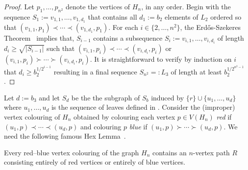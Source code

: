 \documentclass[kpfonts]{patmorin}
\renewcommand{\ge}{\geqslant}
\begin{document}
\begin{proof}
    Let $p_1,\ldots,p_{n^2}$ denote the vertices of $H_n$, in any order.
    Begin with the sequence $S_1:=v_{1,1},\ldots,v_{1,d_1}$ that contains all $d_1:=b_2$ elements of $L_2$ ordered so that $(v_{1,1},p_1)\prec\cdots\prec(v_{1,d_1},p_1)$.  For each $i\in\{2,\ldots,n^2\}$, the Erd\H{o}s-Szekeres Theorem~\citep{ES35} implies that, $S_{i-1}$ contains a subsequence $S_i:=v_{i,1},\ldots,v_{i,d_i}$ of length $d_i\ge \sqrt{|S_{i-1}|}$ such that $(v_{i,1},p_i)\prec\cdots\prec(v_{i,d_i},p_i)$ or $(v_{i,1},p_i)\succ\cdots\succ(v_{i,d_i},p_i)$.  It is straightforward to verify by induction on $i$ that $d_i \ge b_2^{1/2^{i-1}}$ resulting in a final sequence $S_{n^2}=:L_3$ of length at least $b_2^{1/2^{n^2-1}}$.
\end{proof}

Let $d:=b_3$ and let $S_d$ be the the subgraph of $S_b$ induced by $\{r\}\cup\{u_1,\ldots,u_{d}\}$ where $u_1,\ldots,u_d$ is the sequence of leaves defined in .  Consider the (improper) vertex colouring of $H_n$ obtained by colouring each vertex $p\in V(H_n)$ \emph{red} if $(u_1,p)\prec\cdots\prec (u_d,p)$ and colouring $p$ \emph{blue} if $(u_1,p)\succ\cdots\succ(u_d,p)$. We need the following famous Hex Lemma~\citep{Gale79}.

\begin{lem}
Every red--blue vertex colouring of the graph $H_n$	contains an $n$-vertex path $R$ consisting entirely of red vertices or entirely of blue vertices.
\end{lem}

\end{document}
